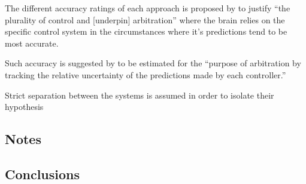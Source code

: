 \documentclass[10pt]{article}
\begin{document}
		The different accuracy ratings of each approach is proposed by \textcite{Daw} to justify ``the plurality of control and [underpin] arbitration'' where the brain relies on the specific control system in the circumstances where it's predictions tend to be most accurate.

		Such accuracy is suggested by \textcite{Daw} to be estimated for the ``purpose of arbitration by tracking the relative uncertainty of the predictions made by each controller.''

		Strict separation between the systems is assumed in order to isolate their hypothesis

	



\subsection{Notes}

\subsection{Conclusions}

\printbibliography
\end{document}
